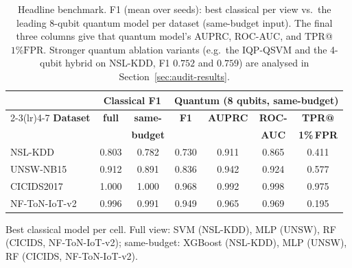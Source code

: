 \documentclass[preprint,11pt]{elsarticle}
\newcommand{\tpr}{\mathrm{TPR}}
\newcommand{\fpr}{\mathrm{FPR}}
\begin{document}
\begin{table}[t]
\centering
\caption{Headline benchmark. F1 (mean over seeds): best classical per view vs.\ the leading
8-qubit quantum model per dataset (same-budget input). The final three columns give that quantum
model's AUPRC, ROC-AUC, and $\tpr$@$1\%\fpr$. Stronger quantum ablation variants (e.g.\ the IQP-QSVM
and the 4-qubit hybrid on NSL-KDD, F1 $0.752$ and $0.759$) are analysed in Section~\ref{sec:audit-results}.}
\label{tab:headline}
\small
\renewcommand{\arraystretch}{1.2}
\setlength{\tabcolsep}{5pt}
\begin{tabular}{@{}lcccccc@{}}
\toprule
& \multicolumn{2}{c}{\textbf{Classical F1}} & \multicolumn{4}{c}{\textbf{Quantum (8 qubits, same-budget)}}\\
\cmidrule(lr){2-3}\cmidrule(lr){4-7}
\textbf{Dataset} & \textbf{full} & \textbf{same-} & \textbf{F1} & \textbf{AUPRC} & \textbf{ROC-} & \textbf{TPR@}\\
                 &               & \textbf{budget} &            &                & \textbf{AUC}  & \textbf{1\%\,FPR}\\
\midrule
NSL-KDD       & 0.803 & 0.782 & 0.730 & 0.911 & 0.865 & 0.411\\
UNSW-NB15     & 0.912 & 0.891 & 0.836 & 0.942 & 0.924 & 0.577\\
CICIDS2017    & 1.000 & 1.000 & 0.968 & 0.992 & 0.998 & 0.975\\
NF-ToN-IoT-v2 & 0.996 & 0.991 & 0.949 & 0.965 & 0.969 & 0.195\\
\bottomrule
\end{tabular}

\smallskip
\begin{minipage}{\textwidth}\footnotesize\raggedright
Best classical model per cell. Full view: SVM (NSL-KDD), MLP (UNSW), RF (CICIDS, NF-ToN-IoT-v2);
same-budget: XGBoost (NSL-KDD), MLP (UNSW), RF (CICIDS, NF-ToN-IoT-v2).
\end{minipage}
\end{table}
\end{document}
